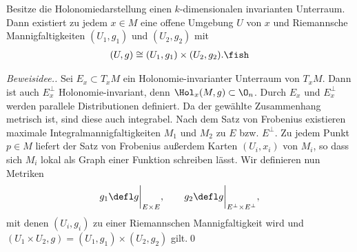 \documentclass[%
	paper=a5,%
	fleqn,%
	DIV=18,%
	BCOR=0mm,
	fontsize=11pt,
	titlepage=false,%
	bibliography=totoc,
	DIV=18,%
	twoside=true,
	pdftitle=Riemannsche Geometrie,
	pdfauthor=Uwe Semmelmann,
	numbers=noendperiod]%
	{scrbook}
\begin{document}
\begin{prop}[Zerlegungssatz]
Besitze die Holonomiedarstellung einen $k$-dimensionalen invarianten Unterraum. Dann existiert zu jedem $x\in M$ eine offene Umgebung $U$ von $x$ und Riemannsche Mannigfaltigkeiten $(U_{1},g_{1})$ und $(U_{2},g_{2})$ mit
\begin{align*}
(U,g) \cong (U_{1},g_{1})\times (U_{2},g_{2}).\fish
\end{align*}
\end{prop}
\begin{proof}[Beweisidee.]
Sei $E_{x}\subset T_{x}M$ ein Holonomie-invarianter Unterraum von $T_{x}M$. Dann ist auch $E_{x}^\bot$ Holonomie-invariant, denn $\Hol_{x}(M,g) \subset \O_{n}$. Durch $E_{x}$ und $E_{x}^\bot$ werden parallele Distributionen definiert. Da der gewählte Zusammenhang metrisch ist, sind diese auch integrabel. Nach dem Satz von Frobenius existieren maximale Integralmannigfaltigkeiten $M_{1}$ und $M_{2}$ zu $E$ bzw. $E^\bot$. Zu jedem Punkt $p\in M$ liefert der Satz von Frobenius außerdem Karten $(U_{i},x_{i})$ von $M_{i}$, so dass sich $M_{i}$ lokal als Graph einer Funktion schreiben lässt. Wir definieren nun Metriken
\begin{align*}
g_{1} \defl g\bigg|_{E\times E},\qquad
g_{2} \defl g\bigg|_{E^\bot\times E^\bot},
\end{align*}
mit denen $(U_{i},g_{i})$ zu einer Riemannschen Mannigfaltigkeit wird und $(U_{1}\times U_{2},g) = (U_{1},g_{1})\times (U_{2},g_{2})$ gilt.\qed
\end{proof}
\end{document}
